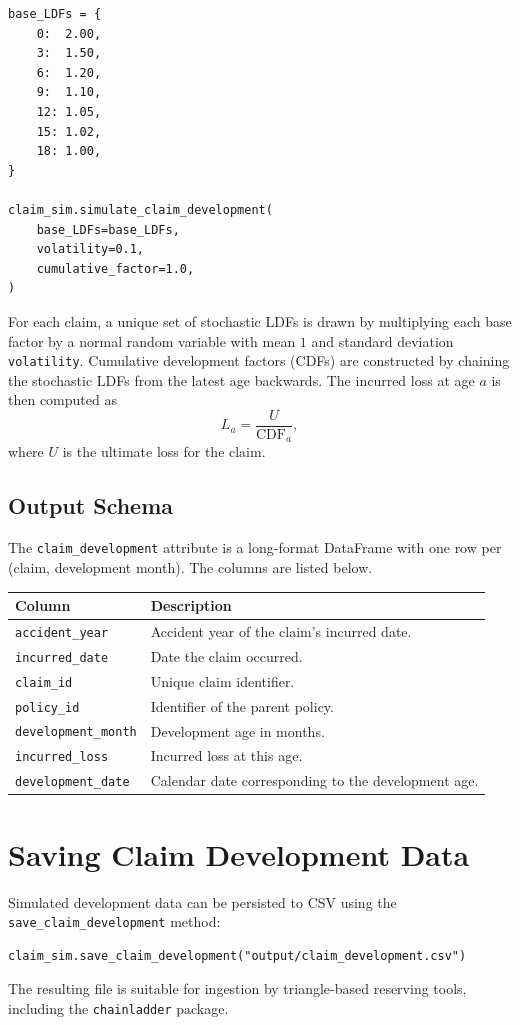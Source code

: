 \begin{lstlisting}[style=pythonstyle]
base_LDFs = {
    0:  2.00,
    3:  1.50,
    6:  1.20,
    9:  1.10,
    12: 1.05,
    15: 1.02,
    18: 1.00,
}

claim_sim.simulate_claim_development(
    base_LDFs=base_LDFs,
    volatility=0.1,
    cumulative_factor=1.0,
)
\end{lstlisting}

For each claim, a unique set of stochastic LDFs is drawn by multiplying
each base factor by a normal random variable with mean $1$ and standard
deviation \texttt{volatility}. Cumulative development factors (CDFs) are
constructed by chaining the stochastic LDFs from the latest age backwards.
The incurred loss at age $a$ is then computed as
\[
    L_a = \frac{U}{\mathrm{CDF}_a},
\]
where $U$ is the ultimate loss for the claim.

\subsection{Output Schema}

The \texttt{claim\_development} attribute is a long-format DataFrame
with one row per (claim, development month). The columns are listed
below.

\begin{center}
\begin{tabular}{ll}
\toprule
\textbf{Column} & \textbf{Description} \\
\midrule
\texttt{accident\_year}     & Accident year of the claim's incurred date. \\
\texttt{incurred\_date}     & Date the claim occurred. \\
\texttt{claim\_id}          & Unique claim identifier. \\
\texttt{policy\_id}         & Identifier of the parent policy. \\
\texttt{development\_month} & Development age in months. \\
\texttt{incurred\_loss}     & Incurred loss at this age. \\
\texttt{development\_date}  & Calendar date corresponding to the
                              development age. \\
\bottomrule
\end{tabular}
\end{center}

\section{Saving Claim Development Data}

Simulated development data can be persisted to CSV using the
\texttt{save\_claim\_development} method:

\begin{lstlisting}[style=pythonstyle]
claim_sim.save_claim_development("output/claim_development.csv")
\end{lstlisting}

The resulting file is suitable for ingestion by triangle-based reserving
tools, including the \texttt{chainladder} package.
